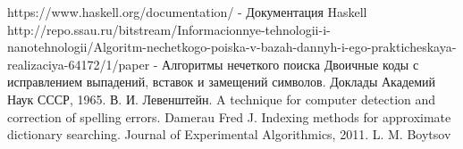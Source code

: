 \documentclass[12pt]{report}
\begin{document}
    \begin{thebibliography}{}
	  https://www.haskell.org/documentation/ - Документация Haskell
	 http://repo.ssau.ru/bitstream/Informacionnye-tehnologii-i-nanotehnologii/Algoritm-nechetkogo-poiska-v-bazah-dannyh-i-ego-prakticheskaya-realizaciya-64172/1/paper - Алгоритмы нечеткого поиска
	 Двоичные коды с исправлением выпадений, вставок и замещений символов. Доклады Академий Наук СССР, 1965. В. И. Левенштейн.
	 A technique for computer detection and correction of spelling errors. Damerau Fred J.
	 Indexing methods for approximate dictionary searching. Journal of Experimental Algorithmics, 2011. L. M. Boytsov
	\end{thebibliography}
    
\end{document}
